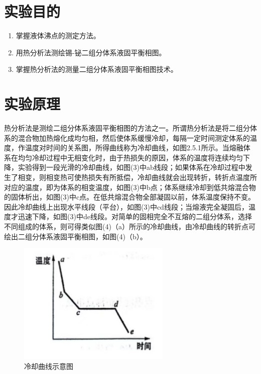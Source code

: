 \documentclass[12pt,hyperref,a4paper,UTF8]{ctexart}
\begin{document}
\cover

%
%

\thispagestyle{empty} %

\newpage
\tableofcontents

\newpage


\section{实验目的}

\begin{enumerate}
    \item 掌握液体沸点的测定方法。
    \item 用热分析法测绘锡-铋二组分体系液固平衡相图。
    \item 掌握热分析法的测量二组分体系液固平衡相图技术。
\end{enumerate}

\section{实验原理}
热分析法是测绘二组分体系液固平衡相图的方法之一。所谓热分析法是将二组分体系的混合物加热熔化成均匀相，然后使体系缓慢冷却，每隔一定时间测定体系的温度，作温度对时间的关系图，所得曲线称为冷却曲线，如图2.5.1所示。当熔融体系在均匀冷却过程中无相变化时，由于热损失的原因，体系的温度将连续均匀下降，实验得到一段光滑的冷却曲线，如图(3)中ab线段；如果体系在冷却过程中发生了相变，则相变热可使热损失有所抵偿，冷却曲线就会出现转折，转折点温度所对应的温度，即为体系的相变温度，如图(3)中b点；体系继续冷却到低共熔混合物的固体析出，如图(3)中c点。在低共熔混合物全部凝固以前，体系温度保持不变。因此冷却曲线上出现水平线段（平台），如图(3)中cd线段；当熔液完全凝固后，温度才迅速下降，如图(3)中de线段。对简单的固相完全不互熔的二组分体系，选择不同组成的体系，则可得类似图(4)（a）所示的冷却曲线，由冷却曲线的转折点可绘出二组分体系液固平衡相图，如图(4)（b）。
\begin{figure}[htp]
    \centering
    \includegraphics[width=0.5\linewidth]{截屏2023-12-22 21.52.49.png}
    \caption{冷却曲线示意图}
    \label{fig:enter-label3}
\end{figure}
\end{document}
